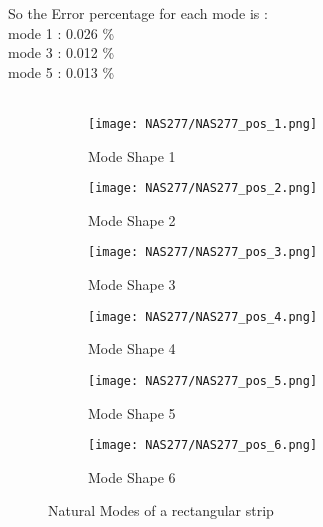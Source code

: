 \documentclass[VM.tex]{subfiles}
\begin{document}
So the Error percentage for each mode is :\\
mode 1 : 0.026 \%  \\
mode 3 : 0.012 \%\\
mode 5 : 0.013 \% \\ \\



\begin{figure}[h!]
\centering
\begin{subfigure}{.8\textwidth}
\texttt{[image: NAS277/NAS277\_pos\_1.png]}
\caption{Mode Shape 1}
\end{subfigure} \vfill
\begin{subfigure}{.8\textwidth}
\texttt{[image: NAS277/NAS277\_pos\_2.png]}
\caption{Mode Shape 2}
\end{subfigure}\vfill
\begin{subfigure}{.8\textwidth}
\texttt{[image: NAS277/NAS277\_pos\_3.png]}
\caption{Mode Shape 3}
\end{subfigure}\vfill
\begin{subfigure}{.8\textwidth}
\texttt{[image: NAS277/NAS277\_pos\_4.png]}
\caption{Mode Shape 4}
\end{subfigure} \vfill
\begin{subfigure}{.8\textwidth}
\texttt{[image: NAS277/NAS277\_pos\_5.png]}
\caption{Mode Shape 5}
\end{subfigure}\vfill
\begin{subfigure}{.8\textwidth}
\texttt{[image: NAS277/NAS277\_pos\_6.png]}
\caption{Mode Shape 6}
\end{subfigure}
\caption{Natural Modes of a rectangular strip}
\end{figure}
\end{document}
